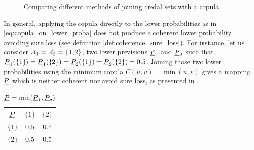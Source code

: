 \begin{figure}[!hb]
    \centering
    \caption{Comparing different methods of joining credal sets with a copula.}
    \label{fig:meaning_computation}
\end{figure}

In general, applying the copula directly to the lower probabilities as in \eqref{eq:copula_on_lower_proba} does not produce a coherent lower probability avoiding sure loss (see definition \ref{def:coherence_sure_loss}). For instance, let us consider $\mathcal{X}_1 = \mathcal{X}_2 = \{1, 2\}$, two lower previsions $\underline{P}_1$ and $\underline{P}_2$ such that $\underline{P}_1(\{1\}) = \underline{P}_1(\{2\}) = \underline{P}_2(\{1\}) = \underline{P}_2(\{2\}) = 0.5$. Joining those two lower probabilities using the minimum copula $C(u,v)=\min(u,v)$ gives a mapping $\underline{P}$ which is neither coherent nor avoid sure loss, as presented in .

\begin{table}[!ht]
    \centering
    \begin{tabular}{|c||c|c|}
        \hline
        \hspace{0.2cm} $\underline{P}$ \hspace{0.2cm} & \hspace{0.2cm} $\{1\}$ \hspace{0.2cm} & \hspace{0.2cm} $\{2\}$ \hspace{0.2cm} \\\hline\hline
        $\{1\}$ & $0.5$ & $0.5$ \\\hline
        $\{2\}$ & $0.5$ & $0.5$\\
        \hline
        \end{tabular}
        \caption{$\underline{P} = \min(\underline{P}_1, \underline{P}_2)$}
        \label{tab:non_coherent_lower}
\end{table}

